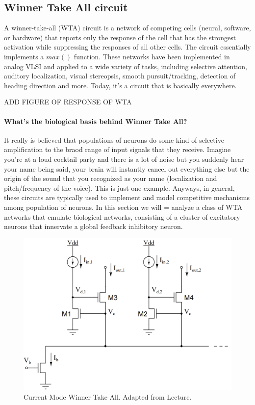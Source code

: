 \subsection{Winner Take All circuit}

A winner-take-all (WTA) circuit is a network of competing cells (neural,
software, or hardware) that reports only the response of the cell that has the strongest activation while suppressing the responses of all other cells. The circuit essentially implements a $max()$ function. These networks have been implemented in analog VLSI and applied to a wide variety of tasks, including selective attention, auditory localization, visual stereopsis, smooth pursuit/tracking, detection of heading direction and more. Today, it's a circuit that is basically everywhere. 

ADD FIGURE OF RESPONSE OF WTA

\paragraph{What's the biological basis behind Winner Take All?} It really is believed that populations of neurons do some kind of selective amplification to the braod range of input signals that they receive. Imagine you're at a loud cocktail party and there is a lot of noise but you suddenly hear your name being said, your brain will instantly cancel out everything else but the origin of the sound that you recognized as your name (localization and pitch/frequency of the voice). This is just one example. Anyways, in general, these circuits are typically used to implement and model competitive mechanisms among population of neurons. In this section we will = analyze a class of WTA networks that emulate biological networks, consisting of a cluster of excitatory neurons that innervate a global feedback inhibitory neuron.


\begin{figure}[H]
    \centering
    \includegraphics[width=0.6\linewidth]{../../Figures/Current_Mode_WTA.PNG}
    \caption{Current Mode Winner Take All. Adapted from Lecture.}
    \label{fig:Winner_Take_All}
\end{figure}

